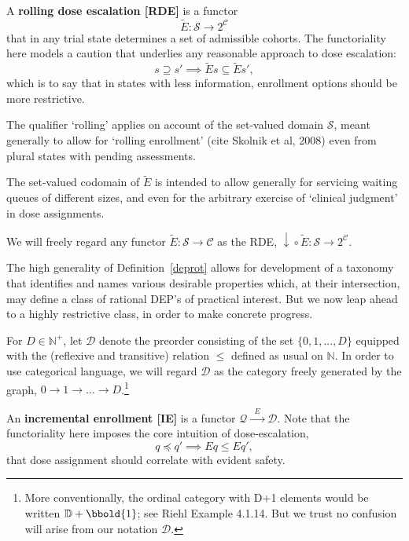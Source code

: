 \documentclass{article}
\newcommand{\N}{\mathbb{N}}
\begin{document}
\begin{defn}\label{deprot}
  A \textbf{rolling dose escalation [RDE]} is a functor
  $$
  \widetilde{E} : \mathcal{S} \rightarrow 2^\mathcal{C}
  $$
  that in any trial state determines a set of admissible cohorts.  The functoriality here models a caution that underlies any reasonable approach to dose escalation:
  $$
  s \supseteq s' \implies \widetilde{E} s \subseteq \widetilde{E} s',
  $$
  which is to say that in states with less information, enrollment options should be more restrictive.

  The qualifier `rolling' applies on account of the set-valued domain $\mathcal{S}$, meant generally to allow for `rolling enrollment' (cite Skolnik et al, 2008) even from plural states with pending assessments.
  
  The set-valued codomain of $\widetilde{E}$ is intended to allow generally for servicing waiting queues of different sizes, and even for the arbitrary exercise of `clinical judgment' in dose assignments.

  We will freely regard any functor $\widetilde{E} : \mathcal{S} \rightarrow \mathcal{C}$ as the RDE, $\downarrow\!\circ \widetilde{E} : \mathcal{S} \rightarrow 2^\mathcal{C}$.
\end{defn}

The high generality of Definition~\ref{deprot} allows for development of a taxonomy that identifies and names various desirable properties which, at their intersection, may define a class of rational DEP's of practical interest.  But we now leap ahead to a highly restrictive class, in order to make concrete progress.

\begin{nota}
  For $D \in \N^+$, let $\mathcal{D}$ denote the preorder consisting of the set $\{0, 1, ..., D\}$ equipped with the (reflexive and transitive) relation $\le$ defined as usual on $\N$.  In order to use categorical language, we will regard $\mathcal{D}$ as the category freely generated by the graph, $0 \rightarrow 1 \rightarrow \dots \rightarrow D$.\footnote{More conventionally, the ordinal category with D+1 elements would be written $\mathbb{D}+\bbold{1}$; see Riehl Example 4.1.14.  But we trust no confusion will arise from our notation $\mathcal{D}$.}
\end{nota}

\begin{defn}
  An \textbf{incremental enrollment [IE]} is a functor $\mathcal{Q} \xrightarrow{\;\;E\;\;} \mathcal{D}$.  Note that the functoriality here imposes the core intuition of dose-escalation,
  $$
  q \preceq q' \implies E q \le E q',
  $$
  that dose assignment should correlate with evident safety.
\end{defn}
\end{document}
